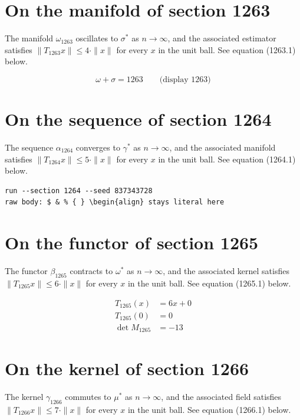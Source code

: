 \documentclass{article}
\begin{document}
\section{On the manifold of section 1263}
The manifold $\omega_{1263}$ oscillates to $\sigma^{*}$ as $n \to \infty$,
and the associated estimator satisfies $\|T_{1263} x\| \leq 4 \cdot \|x\|$
for every $x$ in the unit ball. See equation (1263.1) below.

$$
\omega + \sigma = 1263 \qquad \text{(display 1263)}
$$

\section{On the sequence of section 1264}
The sequence $\alpha_{1264}$ converges to $\gamma^{*}$ as $n \to \infty$,
and the associated manifold satisfies $\|T_{1264} x\| \leq 5 \cdot \|x\|$
for every $x$ in the unit ball. See equation (1264.1) below.

\begin{verbatim}
run --section 1264 --seed 837343728
raw body: $ & % { } \begin{align} stays literal here
\end{verbatim}

\section{On the functor of section 1265}
The functor $\beta_{1265}$ contracts to $\omega^{*}$ as $n \to \infty$,
and the associated kernel satisfies $\|T_{1265} x\| \leq 6 \cdot \|x\|$
for every $x$ in the unit ball. See equation (1265.1) below.

\begin{align}
T_{1265}(x) &= 6 x + 0 \\
T_{1265}(0) &= 0 \\
\det M_{1265} &= -13
\end{align}

\section{On the kernel of section 1266}
The kernel $\gamma_{1266}$ commutes to $\mu^{*}$ as $n \to \infty$,
and the associated field satisfies $\|T_{1266} x\| \leq 7 \cdot \|x\|$
for every $x$ in the unit ball. See equation (1266.1) below.
\end{document}
